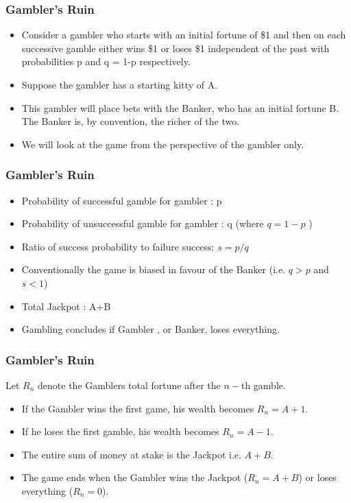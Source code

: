 \documentclass[MAIN.tex]{subfiles}
\begin{document}
 
\begin{frame}
\frametitle{Gambler's Ruin}
\begin{itemize}
\item Consider a gambler who starts with an initial fortune of \$1 and then on each successive gamble
either wins \$1 or loses \$1 independent of the past with probabilities p and q = 1-p respectively.

\item Suppose the gambler has a starting kitty of A.
\item This gambler will place bets with the Banker, who has an initial fortune B. The Banker is, by convention, the richer of the two. 
\item We will look at the game from the perspective of the gambler only.
\end{itemize}
\end{frame}
\begin{frame}
\frametitle{Gambler's Ruin}
\Large
\begin{itemize}
\item Probability of successful gamble for gambler : p
\item Probability of unsuccessful gamble for gambler : q 	(where $q =  1 - p$ )
\item Ratio of success probability to failure success:	$s = p / q$
\item Conventionally the game is biased in favour of the Banker (i.e. $q>p$ and $s<1$)
\item Total Jackpot  : A+B
\item Gambling concludes if Gambler , or Banker, loses everything.
\end{itemize}
\end{frame}
\begin{frame}
\frametitle{Gambler's Ruin}
Let $R_n$ denote the Gamblers total fortune after the $n-$th gamble.

\begin{itemize}
\item If the Gambler wins the first game, his wealth becomes $R_n =A+1$.
\item If he loses the first gamble, his wealth becomes $R_n = A-1$.
\item The entire sum of money at stake is the Jackpot i.e.   $A+B$.
\item The game ends when the Gambler wins the Jackpot ($R_n = A+B$) or loses everything ($R_n = 0$).
\end{itemize}
\end{frame}
\end{document}
